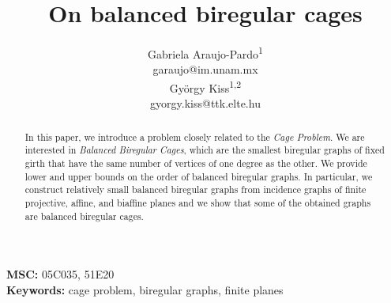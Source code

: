 \documentclass[a4paper,11pt]{article}
\title{On balanced biregular cages}
\author{}
\begin{document}
\author{Gabriela Araujo-Pardo\textsuperscript{1}
 \\
garaujo@im.unam.mx
\\
Gy\"orgy Kiss\textsuperscript{1,2}
 \\
gyorgy.kiss@ttk.elte.hu
}

\maketitle
\begin{abstract}
In this paper, we introduce a problem closely related to the {\emph{Cage Problem}}. We are interested in {\emph{Balanced Biregular Cages}}, which are the smallest biregular graphs of fixed girth that have the same number of vertices of one degree as the other. We provide lower and upper bounds on the order of balanced biregular graphs. In particular, we construct relatively small balanced biregular graphs from incidence graphs of finite projective, affine, and biaffine planes and we show that some of the obtained graphs are balanced biregular cages.
\end{abstract}



\noindent
\textbf{MSC:} 05C035, 51E20\\
\textbf{Keywords:} cage problem, biregular graphs, finite planes 
\end{document}
